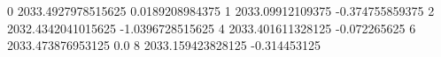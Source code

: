 0 2033.4927978515625 0.0189208984375
1 2033.09912109375 -0.374755859375
2 2032.4342041015625 -1.0396728515625
4 2033.401611328125 -0.072265625
6 2033.473876953125 0.0
8 2033.159423828125 -0.314453125
